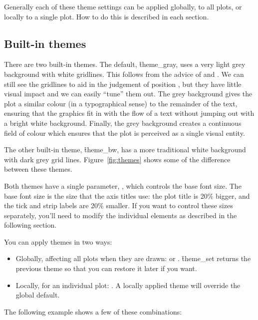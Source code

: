 \noindent Generally each of these theme settings can be applied globally, to all plots, or locally to a single plot.  How to do this is described in each section.

\subsection{Built-in themes}
\label{sec:built_in}

There are two built-in themes.  The default, \f{theme_gray}, uses a very light grey background with white gridlines.  This follows from the advice of \citet{tufte:2006,tufte:1990,tufte:2001,tufte:1997} and \citet{brewer:1994,carr:2002,carr:1994,carr:1999}. We can still see the gridlines to aid in the judgement of position \citep{cleveland:1993a}, but they have little visual impact and we can easily ``tune'' them out. The grey background gives the plot a similar colour (in a typographical sense) to the remainder of the text, ensuring that the graphics fit in with the flow of a text without jumping out with a bright white background. Finally, the grey background creates a continuous field of colour which ensures that the plot is perceived as a single visual entity. 

The other built-in theme, \f{theme_bw}, has a more traditional white background with dark grey grid lines.  Figure~\ref{fig:themes} shows some of the difference between these themes.

Both themes have a single parameter, , which controls the base font size.  The base font size is the size that the axis titles use: the plot title is 20\% bigger, and the tick and strip labels are 20\% smaller.  If you want to control these sizes separately, you'll need to modify the individual elements as described in the following section.

You can apply themes in two ways:

\begin{itemize}
  \item Globally, affecting all plots when they are drawn:  or .  \f{theme_set} returns the previous theme so that you can restore it later if you want.
  
  \item Locally, for an individual plot:  .  A locally applied theme will override the global default.
\end{itemize}

\noindent The following example shows a few of these combinations:

